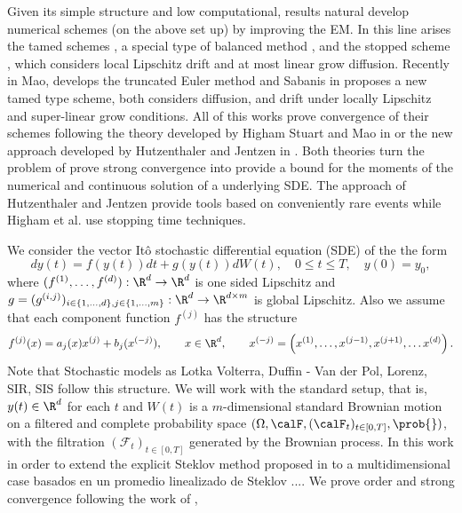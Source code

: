 \documentclass[sort&compress, preprint]{elsarticle}
\theoremstyle{definition}
\theoremstyle{plain}%
\theoremstyle{remark}
\begin{document}
	Given its simple structure and low computational, results natural develop numerical schemes (on the
above set up) by improving the EM. In this line arises the tamed schemes
\cite{Hutzenthaler2012a, Hutzenthaler2015, Wang2011, Sabanis2013, Zong2014}, a special type of balanced method 
\cite{Tretyakov2013}, and the stopped scheme \cite{Liu2013a}, which considers local Lipschitz drift and at most linear 
grow diffusion. Recently in \cite{Mao2015} Mao, develops the truncated Euler method and  Sabanis in \cite{Sabanis2015} 
proposes a new tamed type scheme, both considers diffusion, and drift under locally Lipschitz and super-linear grow 
conditions. All of this works  prove  convergence  of their schemes following the theory developed by Higham Stuart and 
Mao in \cite{Higham2002b} or the new approach developed by  Hutzenthaler and Jentzen in \cite{Hutzenthaler2015}.
Both theories turn the problem of prove strong convergence into provide a bound for the moments of the numerical and 
continuous solution of a underlying SDE. The approach of Hutzenthaler and Jentzen provide tools based on conveniently 
rare events while Higham et al. use stopping time techniques.

We consider the  vector It\^o stochastic differential equation (SDE) of the the form
\begin{equation}\label{eqn:SDE1}
	dy(t)
	 =f(y(t))dt + g(y(t))dW(t), \quad 0\leq t\leq T,
	\quad y(0)=y_0,
\end{equation}
where $(f^{(1)},\dots, f^{(d)}):\R^d \to \R^d$ is one sided Lipschitz and 
$g = (g^{(i,j)})_{i\in \{1,\dots,d\}, j\in\{1,\dots, m\}}:\R^d \to \R^{d\times m}$ is global Lipschitz. Also we assume 
that  each component function $f^{(j)}$  has the structure
$$
	f^{(j)}(x) = a_j(x) x^{(j)} + b_j (x^{(-j)}), \qquad x\in \R^d, \qquad 
	x^{(-j)} = \left( x^{(1)},\dots,x^{(j-1)},x^{(j+1)},\dots x^{(d)}\right).
$$ 
Note that Stochastic models as Lotka Volterra, Duffin - Van der Pol, Lorenz, SIR, SIS follow this structure. 
We will work with the standard setup, that is,  $y(t)\in \R^d$ for each $t$ and  $W(t)$ is a
$m$-dimensional standard Brownian motion on a filtered and complete probability space
$
	(
		\Omega ,\calF,(\calF_t)_{t\in[0,T]},\prob{}
	)
$,
with the filtration
$(\mathcal{F}_t)_{t\in[0,T]}$  generated by the Brownian process.
 In this work in order to extend the explicit Steklov method  proposed in \cite{Diaz-Infante2015}  to a multidimensional case   basados en un promedio linealizado  de Steklov \cite{Diaz-Infante2015} .... We  prove order and strong convergence 
  following the work of \citeauthor*{Higham2002b},
\end{document}
